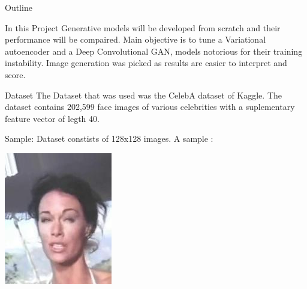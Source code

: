 \documentclass[12pt]{beamer}
\begin{document}
{










\begin{frame}{Outline}

In this Project  Generative models will be developed from scratch and their performance will be compaired. Main objective is to tune a Variational autoencoder and a Deep Convolutional GAN, models notorious for their training instability. Image generation was picked as results are easier to interpret and score. 
\end{frame}



\begin{frame}{Dataset}
The Dataset that was used was the CelebA dataset of Kaggle. The dataset contains 202,599  face images of various celebrities with a suplementary feature vector of legth 40.

\end{frame}



\begin{frame}{Sample:}
Dataset constists of 128x128 images. A sample :
\begin{center}
    \includegraphics[width=0.5\linewidth]{000233.jpg}
    

\end{center}
\end{frame}}
\end{document}
